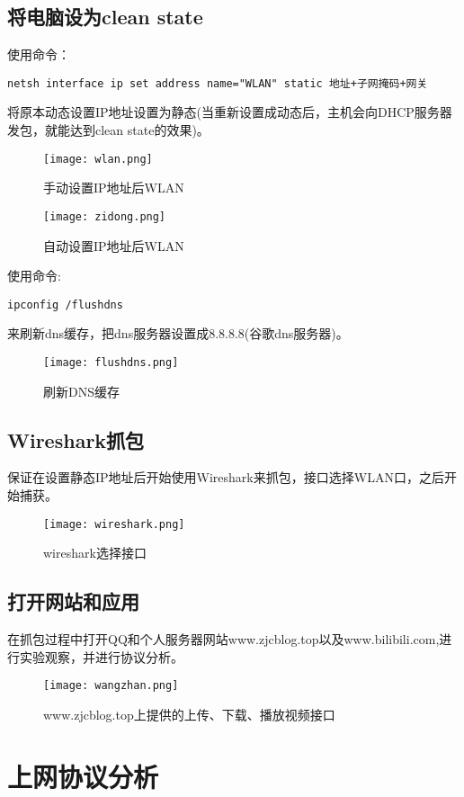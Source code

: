 \documentclass{xjtureport}
\begin{document}
\subsection{将电脑设为clean state}
使用命令：\par
\begin{center}
	\texttt{netsh interface ip set address name="WLAN" static 地址+子网掩码+网关}
\end{center}\par
将原本动态设置IP地址设置为静态(当重新设置成动态后，主机会向DHCP服务器发包，就能达到clean state的效果)。\par
\begin{figure}[H]
	\centering
	\texttt{[image: wlan.png]}
	\caption{手动设置IP地址后WLAN}
\end{figure}
\begin{figure}[H]
	\centering
	\texttt{[image: zidong.png]}
	\caption{自动设置IP地址后WLAN}
\end{figure}
使用命令:\par
\begin{center}
	\texttt{ipconfig /flushdns}
\end{center}\par
来刷新dns缓存，把dns服务器设置成8.8.8.8(谷歌dns服务器)。
\begin{figure}[H]
	\centering
	\texttt{[image: flushdns.png]}
	\caption{刷新DNS缓存}
\end{figure}
\subsection{Wireshark抓包}
保证在设置静态IP地址后开始使用Wireshark来抓包，接口选择WLAN口，之后开始捕获。
\begin{figure}[H]
	\centering
	\texttt{[image: wireshark.png]}
	\caption{wireshark选择接口}
\end{figure}
\subsection{打开网站和应用}
在抓包过程中打开QQ和个人服务器网站www.zjcblog.top以及www.bilibili.com,进行实验观察，并进行协议分析。
\begin{figure}[H]
	\centering
	\texttt{[image: wangzhan.png]}
	\caption{www.zjcblog.top上提供的上传、下载、播放视频接口}
\end{figure}
\section{上网协议分析}
\end{document}
